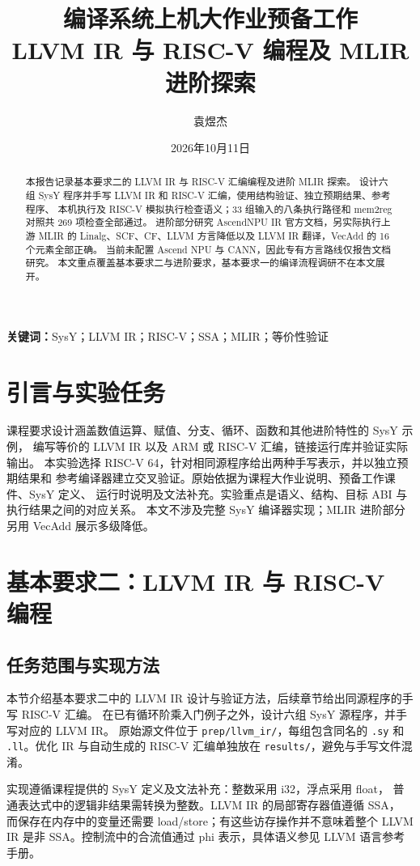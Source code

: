 \documentclass[UTF8,a4paper,11pt]{ctexart}
\title{编译系统上机大作业预备工作\\LLVM IR 与 RISC-V 编程及 MLIR 进阶探索}
\author{袁煜杰}
\date{2026年10月11日}
\begin{document}
\maketitle
\begin{abstract}
本报告记录基本要求二的 LLVM IR 与 RISC-V 汇编编程及进阶 MLIR 探索。
设计六组 SysY 程序并手写 LLVM IR 和 RISC-V 汇编，使用结构验证、独立预期结果、参考程序、
本机执行及 RISC-V 模拟执行检查语义；33 组输入的八条执行路径和 mem2reg 对照共 269 项检查全部通过。
进阶部分研究 AscendNPU IR 官方文档，另实际执行上游 MLIR 的
Linalg、SCF、CF、LLVM 方言降低以及 LLVM IR 翻译，VecAdd 的 16 个元素全部正确。
当前未配置 Ascend NPU 与 CANN，因此专有方言路线仅报告文档研究。
本文重点覆盖基本要求二与进阶要求，基本要求一的编译流程调研不在本文展开。
\end{abstract}
\noindent\textbf{关键词：}SysY；LLVM IR；RISC-V；SSA；MLIR；等价性验证
\newpage\tableofcontents\newpage
\section{引言与实验任务}
课程要求设计涵盖数值运算、赋值、分支、循环、函数和其他进阶特性的 SysY 示例，
编写等价的 LLVM IR 以及 ARM 或 RISC-V 汇编，链接运行库并验证实际输出。
本实验选择 RISC-V 64，针对相同源程序给出两种手写表示，并以独立预期结果和
参考编译器建立交叉验证。原始依据为课程大作业说明、预备工作课件、SysY 定义、
运行时说明及文法补充。实验重点是语义、结构、目标 ABI 与执行结果之间的对应关系。
本文不涉及完整 SysY 编译器实现；MLIR 进阶部分另用 VecAdd 展示多级降低。
\section{基本要求二：LLVM IR 与 RISC-V 编程}
\subsection{任务范围与实现方法}
本节介绍基本要求二中的 LLVM IR 设计与验证方法，后续章节给出同源程序的手写 RISC-V 汇编。
在已有循环阶乘入门例子之外，设计六组 SysY 源程序，并手写对应的 LLVM IR。
原始源文件位于 \texttt{prep/llvm\_ir/}，每组包含同名的 \texttt{.sy} 和
\texttt{.ll}。优化 IR 与自动生成的 RISC-V 汇编单独放在
\texttt{results/}，避免与手写文件混淆。

实现遵循课程提供的 SysY 定义及文法补充：整数采用 i32，浮点采用 float，
普通表达式中的逻辑非结果需转换为整数。LLVM IR 的局部寄存器值遵循 SSA，
而保存在内存中的变量还需要 load/store；有这些访存操作并不意味着整个
LLVM IR 是非 SSA。控制流中的合流值通过 phi 表示，具体语义参见 LLVM
语言参考手册\cite{llvmref}。
\end{document}
